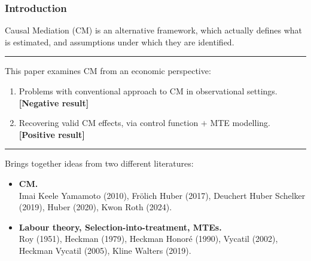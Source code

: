 \documentclass[dvipsnames]{beamer} %
\begin{document}
\begin{frame}
    \frametitle{Introduction}
    Causal Mediation (CM) is an alternative framework, which actually defines what is estimated, and assumptions under which they are identified.

    \par\noindent\rule{\textwidth}{0.4pt}
    This paper examines CM from an economic perspective:
    \begin{enumerate}
        \item Problems with conventional approach to CM in observational settings.
        \\ \textbf{[Negative result]}
        \item Recovering valid CM effects, via control function $+$ MTE modelling.
        \\ \textbf{[Positive result]}
    \end{enumerate}
    \par\noindent\rule{\textwidth}{0.4pt}
    Brings together ideas from two different literatures:
    \begin{itemize}
        \item \textbf{CM.}
        \\ Imai Keele Yamamoto (2010), Fr\"olich Huber (2017), Deuchert Huber Schelker (2019), Huber (2020), Kwon Roth (2024).
        \item \textbf{Labour theory, Selection-into-treatment, MTEs.}
        \\ Roy (1951), Heckman (1979), Heckman Honor\'e (1990), Vycatil (2002), Heckman Vycatil (2005), Kline Walters (2019).
    \end{itemize}
\end{frame}
\end{document}

